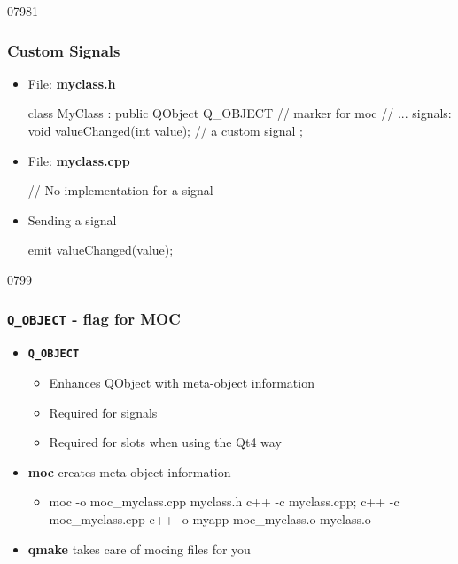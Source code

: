 
\begin{slide}[fragile]{07981}\frametitle{Custom Signals}
\label{codeForSignals1}
\begin{itemize}
\item File: \textbf{myclass.h}
  \begin{cpp}
class MyClass : public QObject
{
  Q_OBJECT // marker for moc
  // ...
signals:
  void valueChanged(int value); // a custom signal
};
  \end{cpp}
\item File: \textbf{myclass.cpp}
  \begin{cpp}
// No implementation for a signal

  \end{cpp}
\item Sending a signal
\begin{cpp}
emit valueChanged(value);
\end{cpp}
\end{itemize}


\end{slide}




\begin{slide}[fragile]{0799}\frametitle{\texttt{Q\_OBJECT} - flag for MOC}
\begin{itemize}
\item \textbf{\texttt{Q\_OBJECT}}
  \begin{itemize}
  \item Enhances QObject with meta-object information
  \item Required for signals
  \item Required for slots when using the Qt4 way
  \end{itemize}\medskip

  \item \textbf{moc} creates meta-object information
    \begin{itemize}
    \item[] \begin{shell}
moc -o moc_myclass.cpp myclass.h
c++ -c myclass.cpp; c++ -c moc_myclass.cpp
c++ -o myapp moc_myclass.o myclass.o
    \end{shell}
 \end{itemize}\medskip

 \item \textbf{qmake} takes care of mocing files for you
\end{itemize}

\end{slide}

